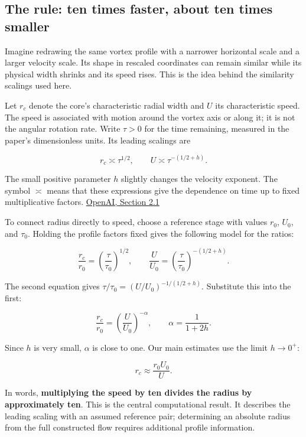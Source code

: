 \documentclass[
  english,
  11pt,
]{article}
\begin{document}
\subsection{The rule: ten times faster, about ten times
smaller}\label{the-rule-ten-times-faster-about-ten-times-smaller}

Imagine redrawing the same vortex profile with a narrower horizontal
scale and a larger velocity scale. Its shape in rescaled coordinates can
remain similar while its physical width shrinks and its speed rises.
This is the idea behind the similarity scalings used here.

Let \(r_c\) denote the core's characteristic radial width and \(U\) its
characteristic speed. The speed is associated with motion around the
vortex axis or along it; it is not the angular rotation rate. Write
\(\tau>0\) for the time remaining, measured in the paper's dimensionless
units. Its leading scalings are

\[
r_c\asymp\tau^{1/2},
\qquad
U\asymp\tau^{-(1/2+h)}.
\]

The small positive parameter \(h\) slightly changes the velocity
exponent. The symbol \(\asymp\) means that these expressions give the
dependence on time up to fixed multiplicative factors.
\href{https://cdn.openai.com/pdf/32d9f210-8b73-45e0-91bc-82a30aef8a9a/navier-stokes.pdf}{OpenAI,
Section 2.1}

To connect radius directly to speed, choose a reference stage with
values \(r_0\), \(U_0\), and \(\tau_0\). Holding the profile factors
fixed gives the following model for the ratios:

\[
\frac{r_c}{r_0}=\left(\frac{\tau}{\tau_0}\right)^{1/2},
\qquad
\frac{U}{U_0}=\left(\frac{\tau}{\tau_0}\right)^{-(1/2+h)}.
\]

The second equation gives \(\tau/\tau_0=(U/U_0)^{-1/(1/2+h)}\).
Substitute this into the first:

\[
\boxed{\frac{r_c}{r_0}
=\left(\frac{U}{U_0}\right)^{-\alpha}},
\qquad
\alpha=\frac{1}{1+2h}.
\]

Since \(h\) is very small, \(\alpha\) is close to one. Our main
estimates use the limit \(h\to0^+\):

\[
\boxed{r_c\approx\frac{r_0U_0}{U}.}
\]

In words, \textbf{multiplying the speed by ten divides the radius by
approximately ten}. This is the central computational result. It
describes the leading scaling with an assumed reference pair;
determining an absolute radius from the full constructed flow requires
additional profile information.
\end{document}
